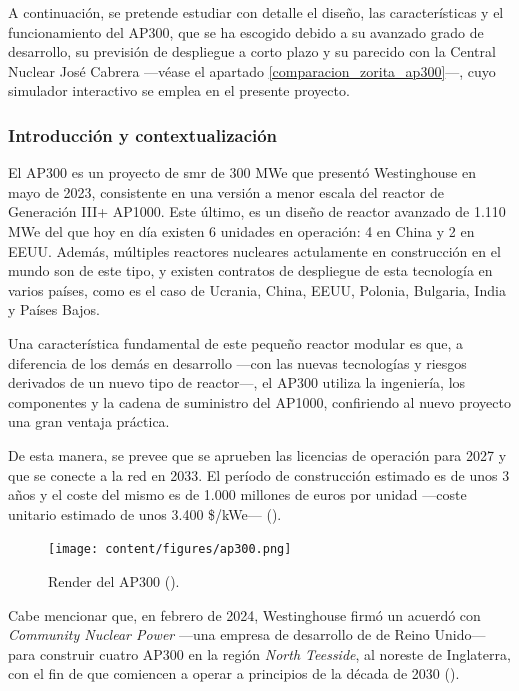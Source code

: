 A continuación, se pretende estudiar con detalle el diseño, las características y el funcionamiento del AP300, que se ha escogido debido a su avanzado grado de desarrollo, su previsión de despliegue a corto plazo y su parecido con la Central Nuclear José Cabrera ---véase el apartado \ref{comparacion_zorita_ap300}---, cuyo simulador interactivo se emplea en el presente proyecto.

\subsubsection{Introducción y contextualización}

El AP300 es un proyecto de \acrshort{smr} de 300 MWe que presentó Westinghouse en mayo de 2023, consistente en una versión a menor escala del reactor de Generación III+ AP1000. Este último, es un diseño de reactor avanzado de 1.110 MWe del que hoy en día existen 6 unidades en operación: 4 en China y 2 en EEUU. Además, múltiples reactores nucleares actulamente en construcción en el mundo son de este tipo, y existen contratos de despliegue de esta tecnología en varios países, como es el caso de Ucrania, China, EEUU, Polonia, Bulgaria, India y Países Bajos.

Una característica fundamental de este pequeño reactor modular es que, a diferencia de los demás  en desarrollo ---con las nuevas tecnologías y riesgos derivados de un nuevo tipo de reactor---, el AP300 utiliza la ingeniería, los componentes y la cadena de suministro del AP1000, confiriendo al nuevo proyecto una gran ventaja práctica. 

De esta manera, se prevee que se aprueben las licencias de operación para 2027 y que se conecte a la red en 2033. El período de construcción estimado es de unos 3 años y el coste del mismo es de 1.000 millones de euros por unidad ---coste unitario estimado de unos 3.400 \$/kWe--- (\cite{ap300_westinghouse}).

\begin{figure}[h]
  \centering
  \texttt{[image: content/figures/ap300.png]}
  \caption{Render del AP300 (\cite{ap300_westinghouse}).}
  \label{fig:AP300}
\end{figure}

Cabe mencionar que, en febrero de 2024, Westinghouse firmó un acuerdó con \emph{Community Nuclear Power} ---una empresa de desarrollo de  de Reino Unido--- para construir cuatro  AP300 en la región \emph{North Teesside}, al noreste de Inglaterra, con el fin de que comiencen a operar a principios de la década de 2030 (\cite{uk_ap300_deployment}).

